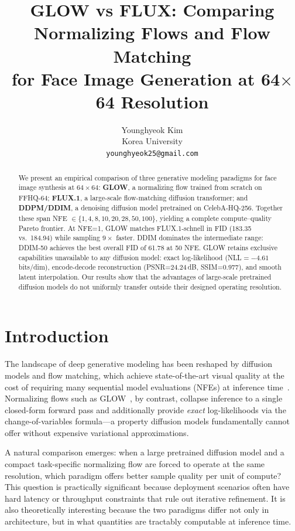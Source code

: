 \documentclass[10pt,twocolumn]{article}
\title{\large\textbf{GLOW vs FLUX: Comparing Normalizing Flows and Flow Matching\\
for Face Image Generation at 64$\times$64 Resolution}}
\author{Younghyeok Kim\\Korea University\\\texttt{younghyeok25@gmail.com}}
\date{}
\begin{document}
\maketitle
\thispagestyle{fancy}

\begin{abstract}
We present an empirical comparison of three generative modeling paradigms for face image synthesis at $64\!\times\!64$: \textbf{GLOW}, a normalizing flow trained from scratch on FFHQ-64; \textbf{FLUX.1}, a large-scale flow-matching diffusion transformer; and \textbf{DDPM/DDIM}, a denoising diffusion model pretrained on CelebA-HQ-256. Together these span NFE $\in\{1,4,8,10,20,28,50,100\}$, yielding a complete compute--quality Pareto frontier. At NFE=1, GLOW matches FLUX.1-schnell in FID (183.35 vs.\ 184.94) while sampling $9\times$ faster. DDIM dominates the intermediate range: DDIM-50 achieves the best overall FID of 61.78 at 50 NFE. GLOW retains exclusive capabilities unavailable to any diffusion model: exact log-likelihood (NLL$=-4.61$ bits/dim), encode-decode reconstruction (PSNR=24.24\,dB, SSIM=0.977), and smooth latent interpolation. Our results show that the advantages of large-scale pretrained diffusion models do not uniformly transfer outside their designed operating resolution.
\end{abstract}

\section{Introduction}
The landscape of deep generative modeling has been reshaped by diffusion models and flow matching, which achieve state-of-the-art visual quality at the cost of requiring many sequential model evaluations (NFEs) at inference time~\cite{ho2020ddpm,lipman2022fm}. Normalizing flows such as GLOW~\cite{kingma2018glow}, by contrast, collapse inference to a single closed-form forward pass and additionally provide \emph{exact} log-likelihoods via the change-of-variables formula---a property diffusion models fundamentally cannot offer without expensive variational approximations.

A natural comparison emerges: when a large pretrained diffusion model and a compact task-specific normalizing flow are forced to operate at the same resolution, which paradigm offers better sample quality per unit of compute? This question is practically significant because deployment scenarios often have hard latency or throughput constraints that rule out iterative refinement. It is also theoretically interesting because the two paradigms differ not only in architecture, but in what quantities are tractably computable at inference time.
\end{document}
